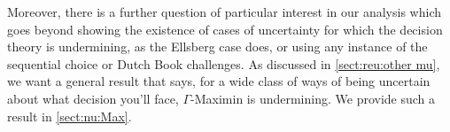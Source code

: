 \documentclass[a4paper,final]{article}
\renewcommand\P{\mathbb{P}} %
\newcommand\EU{\mathrm{EU}}
\newcommand{\IP}{\P}
\newcommand{\todoold}[2][]{\todo[backgroundcolor=white,bordercolor=orange!10,linecolor=gray!10, #1,caption={},textcolor=gray]{Pre-rev: #2}}
\newcommand{\todooldinfo}[2][]{\todoold[#1]{#2}}
\newenvironment{CCM rewritten}
{\begingroup\color{blue}} %
{\endgroup}              %
\begin{document}
{
\label{sect:gamma:other mu}

Moreover, there is a further question of particular interest in our analysis which goes beyond showing the existence of cases of uncertainty for which the decision theory is undermining, as the Ellsberg case does, or using any instance of the sequential choice or Dutch Book challenges. As discussed in \cref{sect:reu:other mu}, we want a general result that says, for a wide class of ways of being uncertain about what decision you'll face, $\Gamma$-Maximin is undermining. We provide such a result in \cref{sect:nu:Max}.



}

\end{document}
